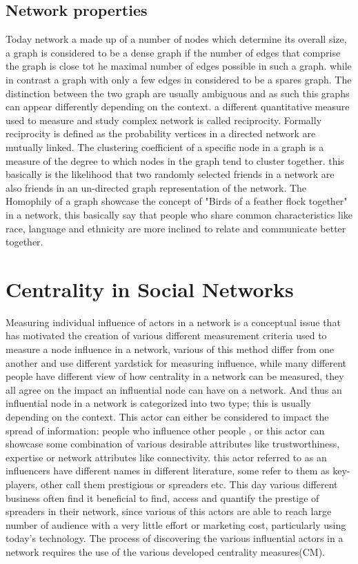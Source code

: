 \subsection{Network properties}
Today network a made up of a number of nodes which determine its overall size, a graph is considered to be a dense graph if the number of edges that comprise the graph is close tot he maximal number of edges possible in such a graph. while in contrast a graph with only a few edges in considered to be a spares graph. The distinction between the two graph are usually ambiguous and as such this graphs can appear differently depending on the context. a different quantitative measure used to measure and study complex network is called reciprocity. Formally reciprocity is defined as the probability vertices in a directed network are mutually linked. The clustering coefficient of a specific node in a graph is a measure of the degree to which nodes in the graph tend to cluster together. this basically is the likelihood  that two randomly selected friends in a network are also friends in an un-directed graph representation of the network. The Homophily of a graph showcase  the concept of "Birds of a feather flock together" in a network, this basically say that people who share common characteristics like race, language and ethnicity are more inclined to relate and communicate better together.  

\section{Centrality in Social Networks}  
Measuring individual influence of actors in a network is a conceptual issue that has motivated the creation of various different measurement criteria used to measure a node influence in a network, various of this method differ from one another and use different yardstick for measuring influence, while many different people have different view of how centrality in a network can be measured, they all agree on the impact an influential node can have on a network. And thus an influential node in a network  is categorized into two type; this is usually depending on the context. This actor can either be considered to impact the spread of information: people who influence other people , or this actor can showcase some combination of various desirable attributes like trustworthiness, expertise or network attributes like connectivity.\cite{kellerInfluentials} this actor  referred to as an influencers have different names in different literature, some refer to them as key-players, other call them prestigious or spreaders etc.  This day various different business often find it beneficial to find, access and quantify the prestige of spreaders in their network, since various of this actors are able to reach large number of audience with a very little effort or marketing cost, particularly using today's technology. The process of discovering the various influential actors in a network requires the use of the various developed centrality measures(CM). 


